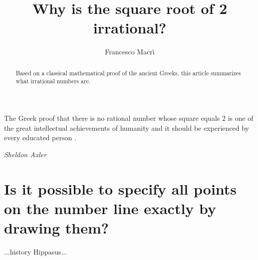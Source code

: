 \documentclass[11pt]{amsart}
\theoremstyle{definition}
\begin{document}
\epigraph{The Greek proof that there is no rational number whose square equals 2 is one of the great intellectual achievements of humanity and it should be experienced by every educated person \cite[4]{axlerAlgebraTrigonometryStudent2012}.} {\textit{Sheldon Axler}}
\title{Why is the square root of 2 irrational?}
\author{Francesco Macrì }
\begin{abstract}
    Based on a classical mathematical proof of the ancient Greeks, this article summarizes what irrational numbers are.
\end{abstract}
\maketitle

\section{Is it possible to specify all points on the number line exactly by drawing them?}
...history Hippasus...
\end{document}
